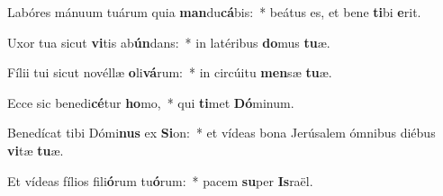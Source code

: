 \item Labóres mánuum tuárum quia \textbf{man}du\textbf{cá}bis:~* beátus es, et bene \textbf{ti}bi \textbf{e}rit.
\item Uxor tua sicut \textbf{vi}tis ab\textbf{ún}dans:~* in latéribus \textbf{do}mus \textbf{tu}æ.
\item Fílii tui sicut novéllæ \textbf{o}li\textbf{vá}rum:~* in circúitu \textbf{men}sæ \textbf{tu}æ.
\item Ecce sic benedi\textbf{cé}tur \textbf{ho}mo,~* qui \textbf{ti}met \textbf{Dó}minum.
\item Benedícat tibi Dómi\textbf{nus} ex \textbf{Si}on:~* et vídeas bona Jerúsalem ómnibus diébus \textbf{vi}tæ \textbf{tu}æ.
\item Et vídeas fílios fili\textbf{ó}rum tu\textbf{ó}rum:~* pacem \textbf{su}per \textbf{Is}raël.
